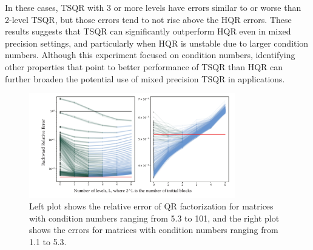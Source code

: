 In these cases, TSQR with 3 or more levels have errors similar to or worse than 2-level TSQR, but those errors tend to not rise above the HQR errors.
These results suggests that TSQR can significantly outperform HQR even in mixed precision settings, and particularly when HQR is unstable due to larger condition numbers.
Although this experiment focused on condition numbers, identifying other properties that point to better performance of TSQR than HQR can further broaden the potential use of mixed precision TSQR in applications.
%

\begin{figure}[h!]%
	\centering
	\includegraphics[width=0.8\textwidth]{./figures/allTSQR2.pdf}
	\caption{\label{fig:allTSQR} Left plot shows the relative error of QR factorization for matrices with condition numbers ranging from 5.3 to 101, and the right plot shows the errors for matrices with condition numbers ranging from 1.1 to 5.3. }
	\vspace{-10pt}
\end{figure} 
